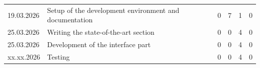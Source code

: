 \begin{landscape}
\begin{longtable}[c]{lp{10cm}rrrr}
		19.03.2026
		     & Setup of the development environment and documentation
		     & 0                                                                                                                   %
		     & 7                                                                                                                   %
		     & 1                                                                                                                   %
		     & 0                                                                                                                   \\ %

		25.03.2026
		     & Writing the state-of-the-art section
		     & 0                                                                                                                   %
		     & 0                                                                                                                   %
		     & 4                                                                                                                   %
		     & 0                                                                                                                   \\ %

		25.03.2026
		     & Development of the interface part
		     & 0                                                                                                                   %
		     & 0                                                                                                                   %
		     & 4                                                                                                                   %
		     & 0                                                                                                                   \\ %


		xx.xx.2026
		     & Testing
		     & 0                                                                                                                   %
		     & 0                                                                                                                   %
		     & 4                                                                                                                   %
		     & 0                                                                                                                   \\ %


\end{longtable}
\end{landscape}

